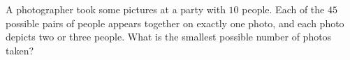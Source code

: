 A photographer took some pictures at a party with $10$ people. Each of the $45$ possible pairs of people appears together on exactly one photo, and each photo depicts two or three people. What is the smallest possible number of photos taken?